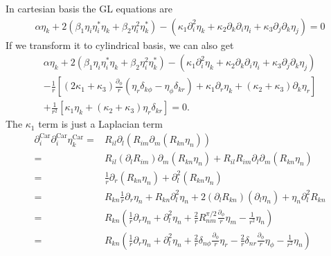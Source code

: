 \documentclass[aps,prl,preprint]{revtex4-2}
\begin{document}
In cartesian basis the GL equations are
\begin{align}
    \alpha\eta_k+2(\beta_1\eta_i\eta_i^*\eta_k
    +\beta_2\eta_i^2\eta_k^*)-\left(\kappa_1\partial_i^2\eta_k
    +\kappa_2\partial_k\partial_i\eta_i
    +\kappa_3\partial_j\partial_k\eta_j\right)=0
\end{align}
If we transform it to cylindrical basis, we can also get
\begin{align}\label{GL-cylin}
    \alpha\eta_k+2(\beta_1\eta_i\eta_i^*\eta_k
    +\beta_2\eta_i^2\eta_k^*)-\left(\kappa_1\partial_i^2\eta_k
    +\kappa_2\partial_k\partial_i\eta_i
    +\kappa_3\partial_j\partial_k\eta_j\right)\nonumber  \\
    -\frac{1}{r}\left[(2\kappa_1+\kappa_3)\frac{\partial_\phi}{r}
        \left(\eta_r\delta_{k\phi}-\eta_\phi\delta_{kr}\right)+\kappa_1\partial_r\eta_k
    +(\kappa_2+\kappa_3)\partial_k\eta_r\right]\nonumber \\
    +\frac{1}{r^2}[\kappa_1\eta_k+(\kappa_2+\kappa_3)\eta_r\delta_{kr}]
    =0.
\end{align}
The $\kappa_1$ term is just a Laplacian term
\begin{align}
    \partial_i^\text{Car}\partial_i^\text{Car}\eta_k^\text{Car}
    = & R_{il}\partial_l(R_{im}\partial_m(R_{kn}\eta_n))                                                                      \\
    = & R_{il}(\partial_lR_{im})\partial_m(R_{kn}\eta_n) + R_{il}R_{im}\partial_l\partial_m(R_{kn}\eta_n)                     \\
    = & \frac{1}{r}\partial_r(R_{kn}\eta_n) + \partial_l^2(R_{kn}\eta_n)                                                      \\
    = & R_{kn}\frac{1}{r}\partial_r\eta_n + R_{kn}\partial_l^2\eta_n + 2(\partial_lR_{kn})(\partial_l\eta_n)
    + \eta_n\partial_l^2R_{kn}                                                                                                \\
    = & R_{kn}\left(\frac{1}{r}\partial_r\eta_n + \partial_l^2\eta_n + \frac{2}{r}R^{\pi/2}_{nm}\frac{\partial_\phi}{r}\eta_m
    -\frac{1}{r^2}\eta_n\right)                                                                                               \\
    = & R_{kn}\left(\frac{1}{r}\partial_r\eta_n + \partial_l^2\eta_n + \frac{2}{r}\delta_{n\phi}\frac{\partial_\phi}{r}\eta_r
    -\frac{2}{r}\delta_{nr}\frac{\partial_\phi}{r}\eta_\phi - \frac{1}{r^2}\eta_n\right)
\end{align}
\end{document}
